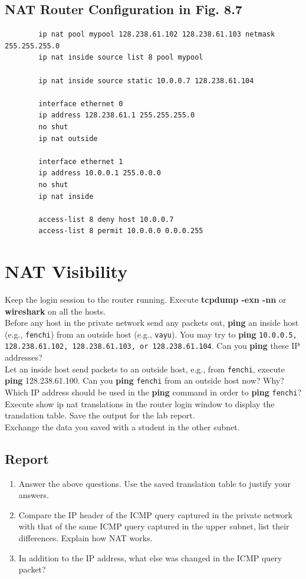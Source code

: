\documentclass{../UTNetLab}
\begin{document}
    \subsection*{NAT Router Configuration in Fig. 8.7}
    \begin{verbatim}
        ip nat pool mypool 128.238.61.102 128.238.61.103 netmask 255.255.255.0
        ip nat inside source list 8 pool mypool

        ip nat inside source static 10.0.0.7 128.238.61.104

        interface ethernet 0
        ip address 128.238.61.1 255.255.255.0
        no shut
        ip nat outside

        interface ethernet 1
        ip address 10.0.0.1 255.0.0.0
        no shut
        ip nat inside

        access-list 8 deny host 10.0.0.7
        access-list 8 permit 10.0.0.0 0.0.0.255
    \end{verbatim}

\section{NAT Visibility}
    Keep the login session to the router running. Execute \textbf{tcpdump -exn -nn} or \textbf{wireshark} on all the hosts. \\
    Before any host in the private network send any packets out, \textbf{ping} an inside host (e.g., \texttt{fenchi}) from an outside host (e.g., \texttt{vayu}). You may try to \textbf{ping} \texttt{10.0.0.5, 128.238.61.102, 128.238.61.103, or 128.238.61.104}. Can you \textbf{ping} these IP addresses? \\
    Let an inside host send packets to an outside host, e.g., from \texttt{fenchi}, execute \textbf{ping} 128.238.61.100. Can you \textbf{ping} \texttt{fenchi} from an outside host now? Why? Which IP address should be used in the \textbf{ping} command in order to \textbf{ping} \texttt{fenchi}? \\
    Execute show ip nat translations in the router login window to display the translation table. Save the output for the lab report. \\
    Exchange the data you saved with a student in the other subnet.
    \subsection*{Report}
    \begin{enumerate}
        \item Answer the above questions.
        Use the saved translation table to justify your answers.
        \item Compare the IP header of the ICMP query captured in the private network with that of the same ICMP query captured in the upper subnet, list their differences.
        Explain how NAT works.
        \item In addition to the IP address, what else was changed in the ICMP query packet?
    \end{enumerate}
\end{document}
